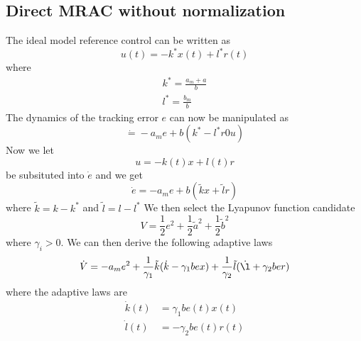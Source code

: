 \documentclass[10pt]{article}
\begin{document}
\begin{multicols*}{2}
\subsection{Direct MRAC without normalization}
The ideal model reference control can be written as 
\begin{equation*}
    u(t) = - k ^* x(t) + l ^* r (t)
\end{equation*} 
where
\begin{equation*}
    \begin{split}
    k ^* = \frac{a_m + a}{b} \\
    l ^* = \frac{b_m}{b}
    \end{split}
\end{equation*}
The dynamics of the tracking error $e$ can now be manipulated as
\begin{equation*}
    \dot = - a_m e + b (k ^* - l ^* r 0 u)
\end{equation*}
Now we let 
\begin{equation*}
    u = -k(t) x + l(t) r
\end{equation*}
be subsituted into $\dot e$ and we get 
\begin{equation*}
    \dot e = - a_m e + b (\tilde{k}x + \tilde{l} r)
\end{equation*}
where $\tilde{k}= k - k ^*$ and $\tilde{l}= l - l ^*$ 
We then select the Lyapunov function candidate
\begin{equation*}
    V = \frac{1}{2} e^2 + \frac{1}{2} \tilde{a}^2 + \frac{1}{2} \tilde{b}^2
\end{equation*}
where $\gamma_i > 0$. We can then derive the following adaptive laws
\begin{equation*}
    \dot V = -a_m e ^2 + \frac{1}{\gamma_1} \tilde{k} (\dot{k} - \gamma_1 b e x) + \frac{1}{\gamma_2} \tilde{l} (\dot{\l} + \gamma_2b e r)
\end{equation*}
where the adaptive laws are
\begin{equation*}
    \begin{split}
        \dot k(t) &= \gamma_1 b e(t) x(t) \\
        \dot l(t) &= - \gamma_2 b e(t) r(t)
    \end{split}
\end{equation*}
\end{multicols*}
\end{document}
